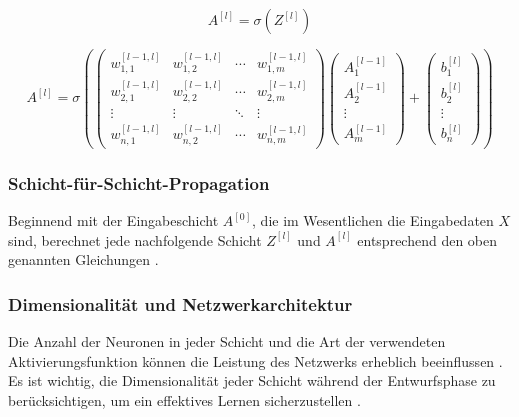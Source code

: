 \begin{equation}
A^{[l]} = \sigma(Z^{[l]})
\end{equation}

\begin{equation}
A^{[l]} = \sigma \left( 
\begin{pmatrix}
w_{1,1}^{[l-1,l]} & w_{1,2}^{[l-1,l]} & \cdots & w_{1,m}^{[l-1,l]} \\
w_{2,1}^{[l-1,l]} & w_{2,2}^{[l-1,l]} & \cdots & w_{2,m}^{[l-1,l]} \\
\vdots & \vdots & \ddots & \vdots \\
w_{n,1}^{[l-1,l]} & w_{n,2}^{[l-1,l]} & \cdots & w_{n,m}^{[l-1,l]}
\end{pmatrix}
\begin{pmatrix}
A_1^{[l-1]} \\
A_2^{[l-1]} \\
\vdots \\
A_m^{[l-1]}
\end{pmatrix}
+
\begin{pmatrix}
b_1^{[l]} \\
b_2^{[l]} \\
\vdots \\
b_n^{[l]}
\end{pmatrix}
\right)
\end{equation}

\subsubsection{Schicht-für-Schicht-Propagation}
Beginnend mit der Eingabeschicht \( A^{[0]} \), die im Wesentlichen die Eingabedaten \( X \) sind, berechnet jede nachfolgende Schicht \( Z^{[l]} \) und \( A^{[l]} \) entsprechend den oben genannten Gleichungen \cite[p.~1421]{russell2021ai}.

\subsubsection{Dimensionalität und Netzwerkarchitektur}
Die Anzahl der Neuronen in jeder Schicht und die Art der verwendeten Aktivierungsfunktion können die Leistung des Netzwerks erheblich beeinflussen \cite[p.~1408]{russell2021ai}. Es ist wichtig, die Dimensionalität jeder Schicht während der Entwurfsphase zu berücksichtigen, um ein effektives Lernen sicherzustellen \cite[p.~73]{Chollet2021}.



